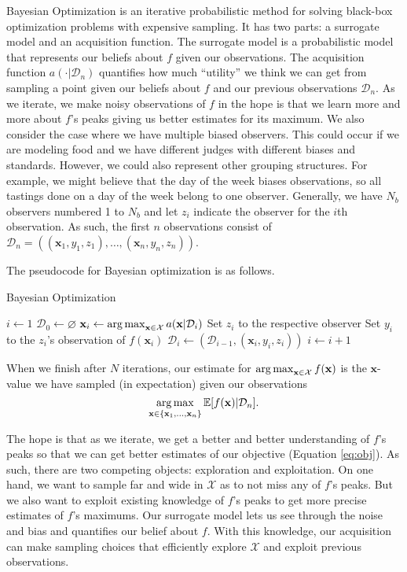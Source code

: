 Bayesian Optimization is an iterative probabilistic method for solving black-box optimization problems with expensive sampling.
It has two parts: a surrogate model and an acquisition function.
The surrogate model is a probabilistic model that represents our beliefs about $f$ given our observations.
The acquisition function $a( \cdot | \mathcal{D}_n)$ quantifies how much ``utility'' we think we can get from sampling a point given our beliefs about $f$ and our previous observations $\mathcal{D}_n$.
As we iterate, we make noisy observations of $f$ in the hope is that we learn more and more about $f$'s peaks giving us better estimates for its maximum.
We also consider the case where we have multiple biased observers.
This could occur if we are modeling food and we have different judges with different biases and standards.
However, we could also represent other grouping structures.
For example, we might believe that the day of the week biases observations, so all tastings done on a day of the week belong to one observer.
Generally, we have $N_b$ observers numbered 1 to $N_b$ and let $z_i$ indicate the observer for the $i$th observation.
As such, the first $n$ observations consist of $\mathcal{D}_n = ((\mathbf{x}_1, y_1, z_1), \ldots, (\mathbf{x}_n, y_n, z_n))$.

The pseudocode for Bayesian optimization is as follows.
\begin{algorithm}
    \begin{algorithmic}
        \caption{Bayesian Optimization}
        \label{alg:bo}
        \State $i \gets 1$
        \State $\mathcal{D}_0 \gets \varnothing$
        \State $\mathbf{x}_i \gets \operatorname*{arg\,max}_{\mathbf{x} \in \mathcal{X}} a(\mathbf{x} | \mathcal{D}_i)$  
        \State Set $z_i$ to the respective observer
        \State Set $y_i$ to the $z_i$'s observation of $f(\mathbf{x}_i)$
        \State $\mathcal{D}_i \gets (\mathcal{D}_{i - 1}, (\mathbf{x}_i, y_i, z_i))$
        \State $i \gets i + 1$
        \EndWhile
    \end{algorithmic}
\end{algorithm}
When we finish after $N$ iterations, our estimate for $\operatorname*{arg\,max}_{\mathbf{x} \in \mathcal{X}}f(\mathbf{x})$ is
the $\mathbf{x}$-value we have sampled (in expectation) given our observations
\begin{equation*}
    \operatorname*{arg\,max}_{\mathbf{x} \in \{ \mathbf{x}_1, \dots, \mathbf{x}_n \} } \mathbb{E}[f(\mathbf{x}) | \mathcal{D}_n].
\end{equation*}

The hope is that as we iterate, we get a better and better understanding of $f$'s peaks so that we can get better estimates of our objective (Equation \ref{eq:obj}).
As such, there are two competing objects: exploration and exploitation.
On one hand, we want to sample far and wide in $\mathcal{X}$ as to not miss any of $f$'s peaks.
But we also want to exploit existing knowledge of $f$'s peaks to get more precise estimates of $f$'s maximums.
Our surrogate model lets us see through the noise and bias and quantifies our belief about $f$.
With this knowledge, our acquisition can make sampling choices that efficiently explore $\mathcal{X}$ and exploit previous observations.
